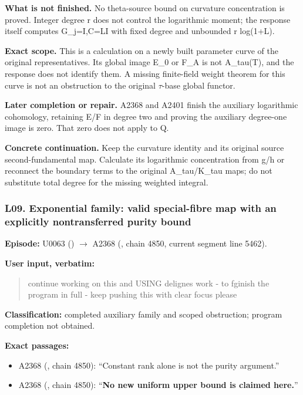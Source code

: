\textbf{What is not finished.} No theta-source bound on curvature
concentration is proved. Integer degree r does not control the
logarithmic moment; the response itself computes G\_j=I,C=LI with fixed
degree and unbounded r log(1+L).

\textbf{Exact scope.} This is a calculation on a newly built parameter
curve of the original representatives. Its global image E\_0 or F\_A is
not A\_tau(T), and the response does not identify them. A missing
finite-field weight theorem for this curve is not an obstruction to the
original \allowbreak{}\ensuremath{τ}\allowbreak{}-base global functor.

\textbf{Later completion or repair.} A2368 and A2401 finish the
auxiliary logarithmic cohomology, retaining E/F in degree two and
proving the auxiliary degree-one image is zero. That zero does not apply
to Q.

\textbf{Concrete continuation.} Keep the curvature identity and its
original source second-fundamental map. Calculate its logarithmic
concentration from g/h or reconnect the boundary terms to the original
A\_tau/K\_tau maps; do not substitute total degree for the missing
weighted integral.

\subsubsection{L09. Exponential family: valid special-fibre map with an
explicitly nontransferred purity
bound}\label{l09.-exponential-family-valid-special-fibre-map-with-an-explicitly-nontransferred-purity-bound}

\textbf{Episode:} U0063
(\protect{})
\allowbreak{}\ensuremath{→}\allowbreak{} A2368
(\protect{}, chain 4850,
current segment line 5462).

\textbf{User input, verbatim:}

\begin{quote}
continue working on this and USING delignes work - to fginish the
program in full - keep pushing this with clear focus please
\end{quote}

\textbf{Classification:} completed auxiliary family and scoped
obstruction; program completion not obtained.

\textbf{Exact passages:}

\begin{itemize}
\tightlist
\item
  A2368 (\protect{}, chain
  4850): ``Constant rank alone is not the purity argument.''
\item
  A2368 (\protect{}, chain
  4850): ``\textbf{No new uniform upper bound is claimed here.}''
\end{itemize}

